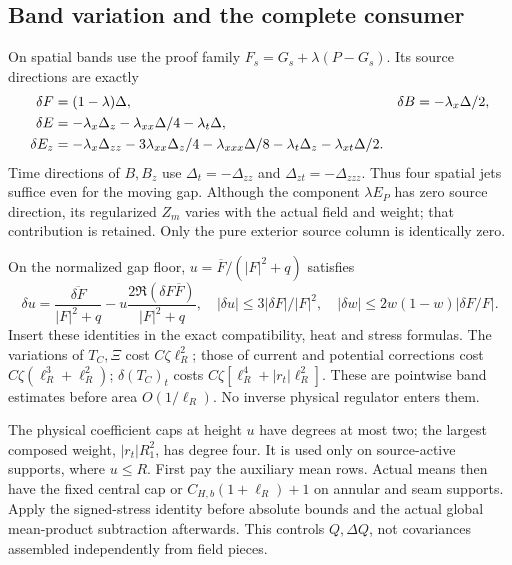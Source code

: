 \subsection{Band variation and the complete consumer}
On spatial bands use the proof family
$F_s=G_s+\lambda(P-G_s)$. Its source directions are exactly
\begin{align}
 \delta F&=(1-\lambda)\Delta,&
 \delta B&=-\lambda_x\Delta/2,\notag\\
 \delta E&=-\lambda_x\Delta_z-\lambda_{xx}\Delta/4-\lambda_t\Delta,
 \notag\\
 \delta E_z&=-\lambda_x\Delta_{zz}
 -3\lambda_{xx}\Delta_z/4-\lambda_{xxx}\Delta/8
 -\lambda_t\Delta_z-\lambda_{xt}\Delta/2.
 \label{eq:sc-band-directions}
\end{align}
Time directions of $B,B_z$ use $\Delta_t=-\Delta_{zz}$ and
$\Delta_{zt}=-\Delta_{zzz}$. Thus four spatial jets suffice even for
the moving gap. Although the component $\lambda E_P$ has zero source
direction, its regularized $Z_m$ varies with the actual field and weight;
that contribution is retained. Only the pure exterior source column is
identically zero.

On the normalized gap floor, $u=\overline F/(|F|^2+q)$ satisfies
\[
 \delta u=\frac{\overline{\delta F}}{|F|^2+q}
 -u\frac{2\Re(\delta F\overline F)}{|F|^2+q},\quad
 |\delta u|\le3|\delta F|/|F|^2,\quad
 |\delta w|\le2w(1-w)|\delta F/F|.
\]
Insert these identities in the exact compatibility, heat and stress
formulas. The variations of $T_C,\Xi$ cost $C\zeta\ell_R^2$;
those of current and potential corrections cost
$C\zeta(\ell_R^3+\ell_R^2)$; $\delta(T_C)_t$ costs
$C\zeta[\ell_R^4+|r_t|\ell_R^2]$.
These are pointwise band estimates before area $O(1/\ell_R)$.
No inverse physical regulator enters them.

The physical coefficient caps at height $u$ have degrees at most two;
the largest composed weight, $|r_t|R_1^2$, has degree four. It is used
only on source-active supports, where $u\le R$.
First pay the auxiliary mean rows. Actual means then have the fixed
central cap or $C_{H,b}(1+\ell_R)+1$ on annular and seam supports.
Apply the signed-stress identity before absolute bounds and the actual
global mean-product subtraction afterwards. This controls $Q,\Delta Q$,
not covariances assembled independently from field pieces.

